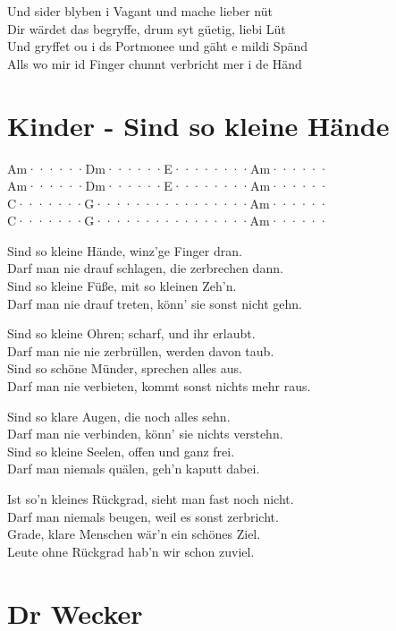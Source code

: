 \documentclass[
  letterpaper,
  twoside=false]{scrbook}
\begin{document}
Und sider blyben i Vagant und mache lieber nüt\\
Dir wärdet das begryffe, drum syt güetig, liebi Lüt\\
Und gryffet ou i ds Portmonee und gäht e mildi Spänd\\
Alls wo mir id Finger chunnt verbricht mer i de Händ

\hypertarget{kinder---sind-so-kleine-huxe4nde}{%
\chapter{Kinder - Sind so kleine
Hände}\label{kinder---sind-so-kleine-huxe4nde}}

Am······\textbar Dm······\textbar E········\textbar Am······\textbar{}\\
Am······\textbar Dm······\textbar E········\textbar Am······\textbar{}\\
C·······\textbar G·······\textbar·········\textbar Am······\textbar{}\\
C·······\textbar G·······\textbar·········\textbar Am······\textbar{}

Sind so kleine Hände, winz'ge Finger dran.\\
Darf man nie drauf schlagen, die zerbrechen dann.\\
Sind so kleine Füße, mit so kleinen Zeh'n.\\
Darf man nie drauf treten, könn' sie sonst nicht gehn.

Sind so kleine Ohren; scharf, und ihr erlaubt.\\
Darf man nie nie zerbrüllen, werden davon taub.\\
Sind so schöne Münder, sprechen alles aus.\\
Darf man nie verbieten, kommt sonst nichts mehr raus.

Sind so klare Augen, die noch alles sehn.\\
Darf man nie verbinden, könn' sie nichts verstehn.\\
Sind so kleine Seelen, offen und ganz frei.\\
Darf man niemals quälen, geh'n kaputt dabei.

Ist so'n kleines Rückgrad, sieht man fast noch nicht.\\
Darf man niemals beugen, weil es sonst zerbricht.\\
Grade, klare Menschen wär'n ein schönes Ziel.\\
Leute ohne Rückgrad hab'n wir schon zuviel.

\hypertarget{dr-wecker}{%
\chapter{Dr Wecker}\label{dr-wecker}}
\end{document}
